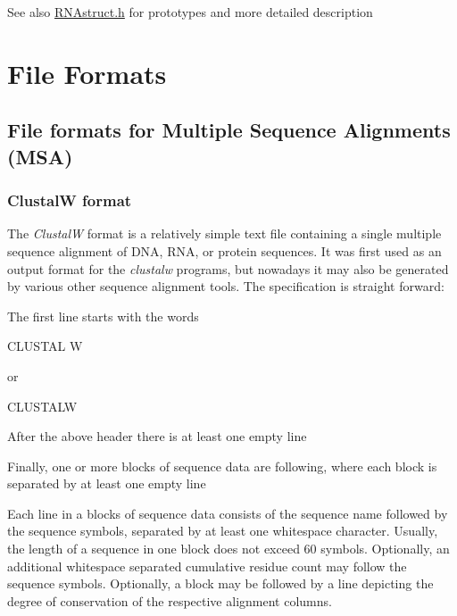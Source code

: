 \begin{DoxySeeAlso}{See also}
\mbox{\hyperlink{_r_n_astruct_8h}{R\+N\+Astruct.\+h}} for prototypes and more detailed description 
\end{DoxySeeAlso}
\hypertarget{file_formats}{}\section{File Formats}\label{file_formats}
\hypertarget{file_formats_msa-formats}{}\subsection{File formats for Multiple Sequence Alignments (\+M\+S\+A)}\label{file_formats_msa-formats}
\hypertarget{file_formats_msa-formats-clustal}{}\subsubsection{Clustal\+W format}\label{file_formats_msa-formats-clustal}
The {\itshape ClustalW} format is a relatively simple text file containing a single multiple sequence alignment of D\+NA, R\+NA, or protein sequences. It was first used as an output format for the {\itshape clustalw} programs, but nowadays it may also be generated by various other sequence alignment tools. The specification is straight forward\+:


\begin{DoxyItemize}
\item The first line starts with the words\begin{DoxyVerb}CLUSTAL W \end{DoxyVerb}
 or \begin{DoxyVerb}CLUSTALW \end{DoxyVerb}

\item After the above header there is at least one empty line
\item Finally, one or more blocks of sequence data are following, where each block is separated by at least one empty line
\end{DoxyItemize}Each line in a blocks of sequence data consists of the sequence name followed by the sequence symbols, separated by at least one whitespace character. Usually, the length of a sequence in one block does not exceed 60 symbols. Optionally, an additional whitespace separated cumulative residue count may follow the sequence symbols. Optionally, a block may be followed by a line depicting the degree of conservation of the respective alignment columns.

